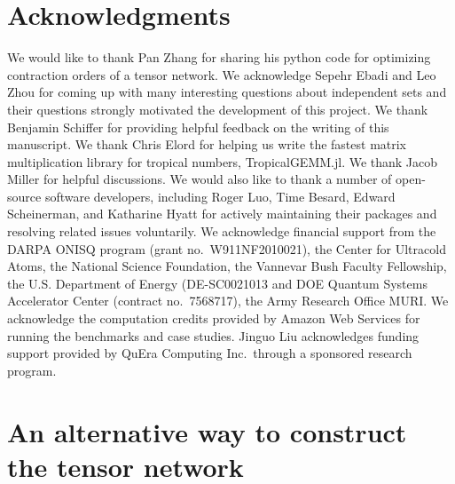 \documentclass[review, onefignum, onetabnum]{siamart190516}
\begin{document}
\section*{Acknowledgments}
We would like to thank Pan Zhang for sharing his python code for optimizing contraction orders of a tensor network.
We acknowledge Sepehr Ebadi and Leo Zhou for coming up with many interesting questions about independent sets and their questions strongly motivated the development of this project.
We thank Benjamin Schiffer for providing helpful feedback on the writing of this manuscript.
We thank Chris Elord for helping us write the fastest matrix multiplication library for tropical numbers, TropicalGEMM.jl. 
We thank Jacob Miller for helpful discussions. 
We would also like to thank a number of open-source software developers, including Roger Luo, Time Besard, Edward Scheinerman, and Katharine Hyatt
for actively maintaining their packages and resolving related issues voluntarily.
We acknowledge financial support from the DARPA ONISQ program (grant no.\ W911NF2010021), the Center for Ultracold Atoms, the National Science Foundation, the Vannevar Bush Faculty Fellowship, the U.S. Department of Energy (DE-SC0021013 and DOE Quantum Systems Accelerator Center (contract no.\ 7568717), 
the Army Research Office MURI. We acknowledge the computation credits provided by Amazon Web Services for running the benchmarks and case studies. Jinguo Liu acknowledges funding support provided by QuEra Computing Inc.\ through a sponsored research program.




\appendix

\section{An alternative way to construct the tensor network}\label{sec:energymodel}
\end{document}
